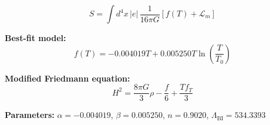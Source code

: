 
\begin{equation}
  S = \int d^4x \, |e| \, \frac{1}{16\pi G} \left[ f(T) + \mathcal{L}_m \right]
\end{equation}

\textbf{Best-fit model:}
\begin{equation}
  f(T) = -0.004019 T + 0.005250 T \ln\!\left(\frac{T}{T_0}\right)
\end{equation}

\textbf{Modified Friedmann equation:}
\begin{equation}
  H^2 = \frac{8\pi G}{3} \rho - \frac{f}{6} + \frac{T f_T}{3}
\end{equation}

\textbf{Parameters:}
$\alpha = -0.004019$, \quad
$\beta = 0.005250$, \quad
$n = 0.9020$, \quad
$\Lambda_{\text{BI}} = 534.3393$